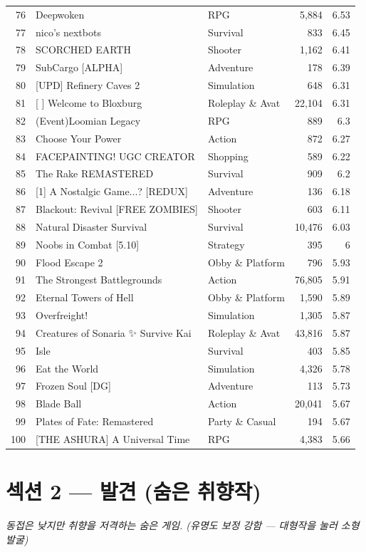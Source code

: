 \documentclass[10pt]{article}
\begin{document}
\begin{longtable}{r l l r r}
76 & Deepwoken & RPG & 5,884 & 6.53 \\
77 & nico's nextbots & Survival & 833 & 6.45 \\
78 & SCORCHED EARTH & Shooter & 1,162 & 6.41 \\
79 & SubCargo [ALPHA] & Adventure & 178 & 6.39 \\
80 & [UPD] Refinery Caves 2 & Simulation & 648 & 6.31 \\
81 & [ ] Welcome to Bloxburg & Roleplay \& Avat & 22,104 & 6.31 \\
82 & (Event)Loomian Legacy & RPG & 889 & 6.3 \\
83 & Choose Your Power & Action & 872 & 6.27 \\
84 & FACEPAINTING! UGC CREATOR & Shopping & 589 & 6.22 \\
85 & The Rake REMASTERED & Survival & 909 & 6.2 \\
86 & [1] A Nostalgic Game...? [REDUX] & Adventure & 136 & 6.18 \\
87 & Blackout: Revival [FREE ZOMBIES] & Shooter & 603 & 6.11 \\
88 & Natural Disaster Survival & Survival & 10,476 & 6.03 \\
89 & Noobs in Combat [5.10] & Strategy & 395 & 6 \\
90 & Flood Escape 2 & Obby \& Platform & 796 & 5.93 \\
91 & The Strongest Battlegrounds & Action & 76,805 & 5.91 \\
92 & Eternal Towers of Hell & Obby \& Platform & 1,590 & 5.89 \\
93 & Overfreight! & Simulation & 1,305 & 5.87 \\
94 & Creatures of Sonaria ✨ Survive Kai & Roleplay \& Avat & 43,816 & 5.87 \\
95 & Isle & Survival & 403 & 5.85 \\
96 & Eat the World & Simulation & 4,326 & 5.78 \\
97 & Frozen Soul [DG] & Adventure & 113 & 5.73 \\
98 & Blade Ball & Action & 20,041 & 5.67 \\
99 & Plates of Fate: Remastered & Party \& Casual & 194 & 5.67 \\
100 & [THE ASHURA] A Universal Time & RPG & 4,383 & 5.66 \\
\bottomrule
\end{longtable}

\newpage
\section*{섹션 2 — 발견 (숨은 취향작)}
\textit{동접은 낮지만 취향을 저격하는 숨은 게임. (유명도 보정 강함 — 대형작을 눌러 소형 발굴)}
\end{document}
